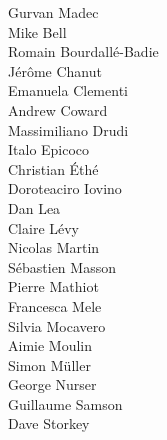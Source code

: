 
 Gurvan Madec                \\
                            Mike Bell                   \\
 Romain Bourdall\'{e}-Badie  \\
                            J\'{e}r\^{o}me Chanut       \\
 Emanuela Clementi           \\
 Andrew Coward               \\
                            Massimiliano Drudi          \\
 Italo Epicoco               \\
                            Christian \'{E}th\'{e}      \\
 Doroteaciro Iovino          \\
                            Dan Lea                     \\
 Claire L\'{e}vy             \\
                            Nicolas Martin              \\
 S\'{e}bastien Masson        \\
                            Pierre Mathiot              \\
 Francesca Mele              \\
 Silvia Mocavero             \\
 Aimie Moulin                \\
                            Simon M\"{u}ller            \\
                            George Nurser               \\
 Guillaume Samson            \\
                            Dave Storkey                \\
